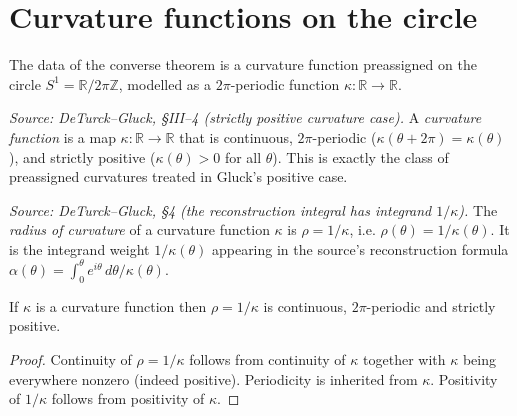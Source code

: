 \chapter{Curvature functions on the circle}
\label{chap:curvature}


The data of the converse theorem is a curvature function preassigned on the
circle $S^1 = \mathbb{R}/2\pi\mathbb{Z}$, modelled as a $2\pi$-periodic function
$\kappa : \mathbb{R} \to \mathbb{R}$.

\begin{definition}
  \label{def:is_curvature_function}
  \textit{Source: DeTurck--Gluck, §III–4 (strictly positive curvature case).}
  A \emph{curvature function} is a map $\kappa : \mathbb{R} \to \mathbb{R}$ that
  is continuous, $2\pi$-periodic ($\kappa(\theta + 2\pi) = \kappa(\theta)$), and
  strictly positive ($\kappa(\theta) > 0$ for all $\theta$). This is exactly the
  class of preassigned curvatures treated in Gluck's positive case.
\end{definition}

\begin{definition}
  \label{def:radius}
  \textit{Source: DeTurck--Gluck, §4 (the reconstruction integral has integrand $1/\kappa$).}
  The \emph{radius of curvature} of a curvature function $\kappa$ is
  $\rho = 1/\kappa$, i.e. $\rho(\theta) = 1/\kappa(\theta)$. It is the integrand
  weight $1/\kappa(\theta)$ appearing in the source's reconstruction formula
  $\alpha(\theta) = \int_0^\theta e^{i\theta}\,d\theta/\kappa(\theta)$.
\end{definition}

\begin{lemma}
  \label{lem:radius_props}
  If $\kappa$ is a curvature function then $\rho = 1/\kappa$ is continuous,
  $2\pi$-periodic and strictly positive.
\end{lemma}
\begin{proof}

\leanok
  Continuity of $\rho = 1/\kappa$ follows from continuity of $\kappa$ together
  with $\kappa$ being everywhere nonzero (indeed positive). Periodicity is
  inherited from $\kappa$. Positivity of $1/\kappa$ follows from positivity of
  $\kappa$.
\end{proof}

